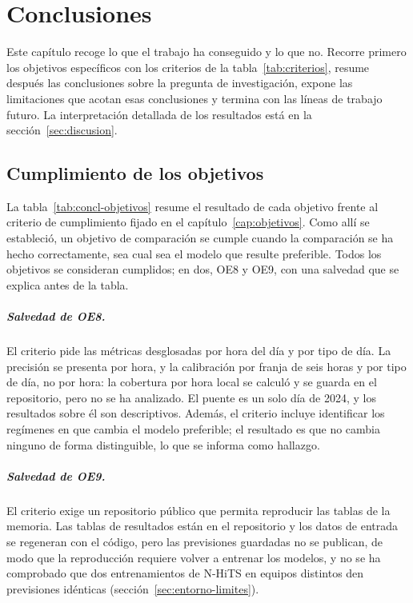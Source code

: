 
\chapter{Conclusiones}\label{cap:conclusiones}

Este capítulo recoge lo que el trabajo ha conseguido y lo que no. Recorre
primero los objetivos específicos con los criterios de la
tabla~\ref{tab:criterios}, resume después las conclusiones sobre la pregunta de
investigación, expone las limitaciones que acotan esas conclusiones y termina
con las líneas de trabajo futuro. La interpretación detallada de los resultados
está en la sección~\ref{sec:discusion}.

\section{Cumplimiento de los objetivos}\label{sec:concl-objetivos}

La tabla~\ref{tab:concl-objetivos} resume el resultado de cada objetivo frente
al criterio de cumplimiento fijado en el capítulo~\ref{cap:objetivos}. Como allí
se estableció, un objetivo de comparación se cumple cuando la comparación se ha
hecho correctamente, sea cual sea el modelo que resulte preferible. Todos los
objetivos se consideran cumplidos; en dos, OE8 y OE9, con una salvedad que se
explica antes de la tabla.

\paragraph{Salvedad de OE8.} El criterio pide las métricas desglosadas por hora
del día y por tipo de día. La precisión se presenta por hora, y la calibración
por franja de seis horas y por tipo de día, no por hora: la cobertura por hora
local se calculó y se guarda en el repositorio, pero no se ha analizado. El
puente es un solo día de 2024, y los resultados sobre él son descriptivos.
Además, el criterio incluye identificar los regímenes en que cambia el modelo
preferible; el resultado es que no cambia ninguno de forma distinguible, lo que
se informa como hallazgo.

\paragraph{Salvedad de OE9.} El criterio exige un repositorio público que permita
reproducir las tablas de la memoria. Las tablas de resultados están en el
repositorio y los datos de entrada se regeneran con el código, pero las
previsiones guardadas no se publican, de modo que la reproducción requiere
volver a entrenar los modelos, y no se ha comprobado que dos entrenamientos de
N-HiTS en equipos distintos den previsiones idénticas
(sección~\ref{sec:entorno-limites}).


